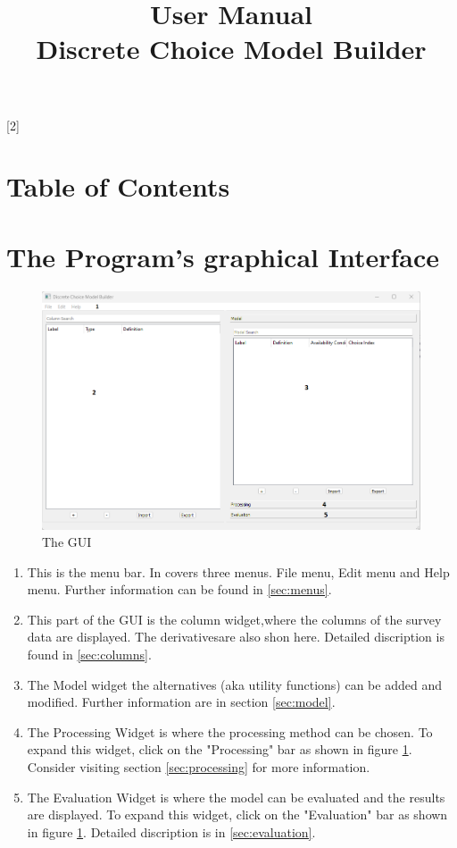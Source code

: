 \documentclass{article}
\title{User Manual \\
        Discrete Choice Model Builder}
\date{}
\begin{document}
\maketitle
\thispagestyle{empty}
\newpage
\startcontents[maintableofcontents]
[2]{\section*{Table of Contents}}
\thispagestyle{empty}
\newpage
{}

\newpage
\section{The Program's graphical Interface}
\begin{figure}[H]%
  \centering
  \includegraphics[width=15cm]{docs/User Manual/img/GUI.png}
  \caption{The GUI}
  \label{fig:gui}
\end{figure} 
\begin{enumerate} [label=\textbf{\arabic*})]
    \item This is the menu bar. In covers three menus. File menu, Edit menu and Help menu. Further information can be found in \ref{sec:menus}.
    \item This part of the GUI is the column widget,where the columns of the survey data are displayed. The derivativesare also shon here. Detailed discription is found in \ref{sec:columns}.
    \item The Model widget the alternatives (aka utility functions) can be added and modified. Further information are in section \ref{sec:model}.
    \item The Processing Widget is where the processing method can be chosen. To expand this widget, click on the "Processing" bar as shown in figure \ref{fig:gui}. Consider visiting section \ref{sec:processing} for more information.
    \item The Evaluation Widget is where the model can be evaluated and the results are displayed. To expand this widget, click on the "Evaluation" bar as shown in figure \ref{fig:gui}. Detailed discription is in \ref{sec:evaluation}.
\end{enumerate}
\end{document}
